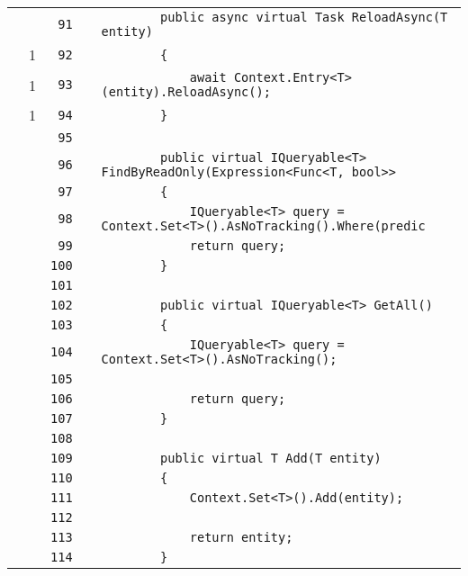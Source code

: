 \documentclass[a4paper,10pt]{article}
\begin{document}
\begin{longtable}[l]{lrrll}
\cellcolor{gray} &  & \verb~91~ & & \verb~        public async virtual Task ReloadAsync(T entity)~\\
\cellcolor{green} & 1 & \verb~92~ & & \verb~        {~\\
\cellcolor{green} & 1 & \verb~93~ & & \verb~            await Context.Entry<T>(entity).ReloadAsync();~\\
\cellcolor{green} & 1 & \verb~94~ & & \verb~        }~\\
\cellcolor{gray} &  & \verb~95~ & & \verb~~\\
\cellcolor{gray} &  & \verb~96~ & & \verb~        public virtual IQueryable<T> FindByReadOnly(Expression<Func<T, bool>> ~\\
\cellcolor{gray} &  & \verb~97~ & & \verb~        {~\\
\cellcolor{gray} &  & \verb~98~ & & \verb~            IQueryable<T> query = Context.Set<T>().AsNoTracking().Where(predic~\\
\cellcolor{gray} &  & \verb~99~ & & \verb~            return query;~\\
\cellcolor{gray} &  & \verb~100~ & & \verb~        }~\\
\cellcolor{gray} &  & \verb~101~ & & \verb~~\\
\cellcolor{gray} &  & \verb~102~ & & \verb~        public virtual IQueryable<T> GetAll()~\\
\cellcolor{gray} &  & \verb~103~ & & \verb~        {~\\
\cellcolor{gray} &  & \verb~104~ & & \verb~            IQueryable<T> query = Context.Set<T>().AsNoTracking();~\\
\cellcolor{gray} &  & \verb~105~ & & \verb~~\\
\cellcolor{gray} &  & \verb~106~ & & \verb~            return query;~\\
\cellcolor{gray} &  & \verb~107~ & & \verb~        }~\\
\cellcolor{gray} &  & \verb~108~ & & \verb~~\\
\cellcolor{gray} &  & \verb~109~ & & \verb~        public virtual T Add(T entity)~\\
\cellcolor{gray} &  & \verb~110~ & & \verb~        {~\\
\cellcolor{gray} &  & \verb~111~ & & \verb~            Context.Set<T>().Add(entity);~\\
\cellcolor{gray} &  & \verb~112~ & & \verb~~\\
\cellcolor{gray} &  & \verb~113~ & & \verb~            return entity;~\\
\cellcolor{gray} &  & \verb~114~ & & \verb~        }~\\

\end{longtable}
\end{document}
